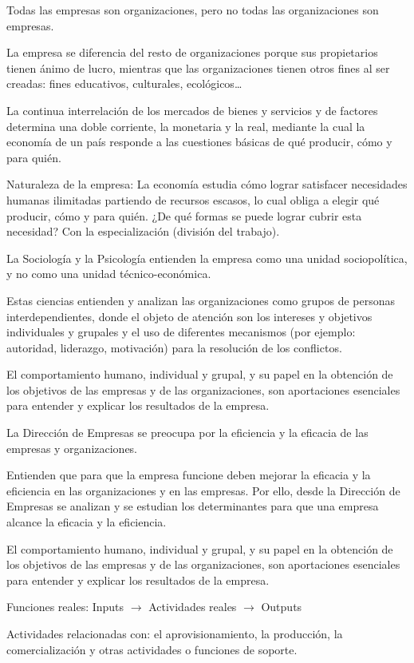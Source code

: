 \documentclass[12pt, twoside, openright]{report} %
\begin{document}
Todas las empresas son organizaciones, pero no todas las organizaciones son empresas.

La empresa se diferencia del resto de organizaciones porque sus propietarios tienen ánimo de lucro, mientras
que las organizaciones tienen otros fines al ser creadas: fines educativos, culturales, ecológicos…

La continua interrelación de los mercados de bienes y servicios y de factores determina una doble corriente,
la monetaria y la real, mediante la cual la economía de un país responde a las cuestiones básicas de qué
producir, cómo y para quién.

Naturaleza de la empresa: La economía estudia cómo lograr satisfacer necesidades humanas ilimitadas
partiendo de recursos escasos, lo cual obliga a elegir qué producir, cómo y para quién. ¿De qué formas se
puede lograr cubrir esta necesidad? Con la especialización (división del trabajo).

La Sociología y la Psicología entienden la empresa como una unidad sociopolítica, y no como una unidad
técnico-económica.

Estas ciencias entienden y analizan las organizaciones como grupos de personas interdependientes, donde
el objeto de atención son los intereses y objetivos individuales y grupales y el uso de diferentes mecanismos
(por ejemplo: autoridad, liderazgo, motivación) para la resolución de los conflictos.

El comportamiento humano, individual y grupal, y su papel en la obtención de los objetivos de las empresas
y de las organizaciones, son aportaciones esenciales para entender y explicar los resultados de la empresa.

La Dirección de Empresas se preocupa por la eficiencia y la eficacia de las empresas y organizaciones.

Entienden que para que la empresa funcione deben mejorar la eficacia y la eficiencia en las organizaciones y
en las empresas. Por ello, desde la Dirección de Empresas se analizan y se estudian los determinantes para
que una empresa alcance la eficacia y la eficiencia.

El comportamiento humano, individual y grupal, y su papel en la obtención de los objetivos de las empresas
y de las organizaciones, son aportaciones esenciales para entender y explicar los resultados de la empresa.

Funciones reales: Inputs $\rightarrow$ Actividades reales $\rightarrow$ Outputs

Actividades relacionadas con: el aprovisionamiento, la producción, la comercialización y otras actividades o
funciones de soporte.
\end{document}
